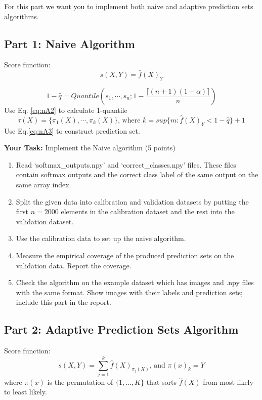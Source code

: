 \documentclass[11pt, oneside]{article}   	%
\begin{document}
For this part we want you to implement both naive and adaptive prediction sets algorithms.
\subsection*{Part 1: Naive Algorithm}
Score function:
\begin{equation}\label{eq:nA1}
s(X,Y)=\hat{f}(X)_{Y} 
\end{equation}

\begin{equation}\label{eq:nA2}
1-\hat{q}=Quantile(s_1,\cdots,s_n;1-\frac{\lceil (n+1)(1-\alpha) \rceil}{n})
\end{equation}
Use Eq. \ref{eq:nA2} to calculate 1-quantile 
\begin{equation}\label{eq:nA3}
\tau (X) =\{ \pi_1(X),\cdots,\pi_k(X)\}
\text{, where } k=sup \{m:\hat{f}(X)_{Y}<1-\hat{q}\}+1
\end{equation}
Use Eq.\ref{eq:nA3} to construct prediction set.

\textbf{Your Task:} 
Implement the Naive algorithm (5 points)
\begin{enumerate}
    \item Read `softmax\_outputs.npy' and `correct\_classes.npy' files. These files contain softmax outputs and the correct class label of the same output on the same array index.
    \item Split the given data into calibration and validation datasets by putting the first \( n = 2000 \) elements in the calibration dataset and the rest into the validation dataset.
    \item Use the calibration data to set up the naive algorithm.
    \item Measure the empirical coverage of the produced prediction sets on the validation data. Report the coverage.
    \item Check the algorithm on the example dataset which has images and .npy files with the same format. Show images with their labels and prediction sets; include this part in the report.
\end{enumerate}


\subsection*{Part 2: Adaptive Prediction Sets Algorithm}
Score function:
\begin{equation}\label{eq:A1}
s(X,Y)=\sum_{j=1}^{k}\hat{f}(X)_{\pi_j(X)} \text{, and } \pi(x)_k=Y
\end{equation}
where $\pi(x)$ is the permutation of $\{1, ..., K\}$ that sorts $\hat{f}(X)$ from most likely to least likely.
\end{document}
